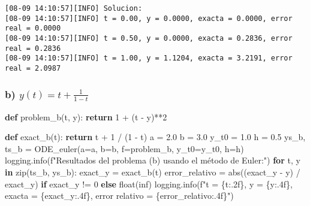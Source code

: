 \documentclass[
  letterpaper,
  DIV=11,
  numbers=noendperiod]{scrartcl}
\newenvironment{Shaded}{\begin{snugshade}}{\end{snugshade}}
\newcommand{\BuiltInTok}[1]{\textcolor[rgb]{0.00,0.23,0.31}{#1}}
\newcommand{\ControlFlowTok}[1]{\textcolor[rgb]{0.00,0.23,0.31}{\textbf{#1}}}
\newcommand{\DecValTok}[1]{\textcolor[rgb]{0.68,0.00,0.00}{#1}}
\newcommand{\FloatTok}[1]{\textcolor[rgb]{0.68,0.00,0.00}{#1}}
\newcommand{\KeywordTok}[1]{\textcolor[rgb]{0.00,0.23,0.31}{\textbf{#1}}}
\newcommand{\NormalTok}[1]{\textcolor[rgb]{0.00,0.23,0.31}{#1}}
\newcommand{\OperatorTok}[1]{\textcolor[rgb]{0.37,0.37,0.37}{#1}}
\newcommand{\SpecialCharTok}[1]{\textcolor[rgb]{0.37,0.37,0.37}{#1}}
\newcommand{\SpecialStringTok}[1]{\textcolor[rgb]{0.13,0.47,0.30}{#1}}
\newcommand{\StringTok}[1]{\textcolor[rgb]{0.13,0.47,0.30}{#1}}
\begin{document}
\begin{verbatim}
[08-09 14:10:57][INFO] Solucion:
[08-09 14:10:57][INFO] t = 0.00, y = 0.0000, exacta = 0.0000, error real = 0.0000
[08-09 14:10:57][INFO] t = 0.50, y = 0.0000, exacta = 0.2836, error real = 0.2836
[08-09 14:10:57][INFO] t = 1.00, y = 1.1204, exacta = 3.2191, error real = 2.0987
\end{verbatim}

\subsubsection{\texorpdfstring{b)
\(y(t)=t+\frac{1}{1-t}\)}{b) y(t)=t+\textbackslash frac\{1\}\{1-t\}}}\label{b-yttfrac11-t}

\begin{Shaded}
\begin{Highlighting}[]
\KeywordTok{def}\NormalTok{ problem\_b(t, y):}
    \ControlFlowTok{return} \DecValTok{1} \OperatorTok{+}\NormalTok{ (t }\OperatorTok{{-}}\NormalTok{ y)}\OperatorTok{**}\DecValTok{2}

\KeywordTok{def}\NormalTok{ exact\_b(t):}
    \ControlFlowTok{return}\NormalTok{ t }\OperatorTok{+} \DecValTok{1} \OperatorTok{/}\NormalTok{ (}\DecValTok{1} \OperatorTok{{-}}\NormalTok{ t)}
\NormalTok{a }\OperatorTok{=} \FloatTok{2.0}
\NormalTok{b }\OperatorTok{=} \FloatTok{3.0}
\NormalTok{y\_t0 }\OperatorTok{=} \FloatTok{1.0}
\NormalTok{h }\OperatorTok{=} \FloatTok{0.5}
\NormalTok{ys\_b, ts\_b }\OperatorTok{=}\NormalTok{ ODE\_euler(a}\OperatorTok{=}\NormalTok{a, b}\OperatorTok{=}\NormalTok{b, f}\OperatorTok{=}\NormalTok{problem\_b, y\_t0}\OperatorTok{=}\NormalTok{y\_t0, h}\OperatorTok{=}\NormalTok{h)}
\NormalTok{logging.info(}\SpecialStringTok{f"Resultados del problema (b) usando el método de Euler:"}\NormalTok{)}
\ControlFlowTok{for}\NormalTok{ t, y }\KeywordTok{in} \BuiltInTok{zip}\NormalTok{(ts\_b, ys\_b):}
\NormalTok{    exact\_y }\OperatorTok{=}\NormalTok{ exact\_b(t)}
\NormalTok{    error\_relativo }\OperatorTok{=} \BuiltInTok{abs}\NormalTok{((exact\_y }\OperatorTok{{-}}\NormalTok{ y) }\OperatorTok{/}\NormalTok{ exact\_y) }\ControlFlowTok{if}\NormalTok{ exact\_y }\OperatorTok{!=} \DecValTok{0} \ControlFlowTok{else} \BuiltInTok{float}\NormalTok{(}\StringTok{\textquotesingle{}inf\textquotesingle{}}\NormalTok{)}
\NormalTok{    logging.info(}\SpecialStringTok{f"t = }\SpecialCharTok{\{}\NormalTok{t}\SpecialCharTok{:.2f\}}\SpecialStringTok{, y = }\SpecialCharTok{\{}\NormalTok{y}\SpecialCharTok{:.4f\}}\SpecialStringTok{, exacta = }\SpecialCharTok{\{}\NormalTok{exact\_y}\SpecialCharTok{:.4f\}}\SpecialStringTok{, error relativo = }\SpecialCharTok{\{}\NormalTok{error\_relativo}\SpecialCharTok{:.4f\}}\SpecialStringTok{"}\NormalTok{)}
\end{Highlighting}
\end{Shaded}
\end{document}
